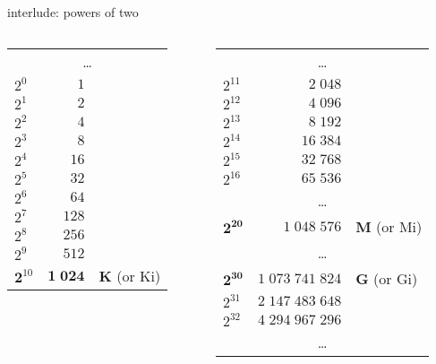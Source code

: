 \begin{frame}[t]{interlude: powers of two}
\begin{columns}[t]
\begin{column}{0.5\textwidth}
\small
\begin{tabular}{lrl}
\multicolumn{3}{c}{\ldots} \\
$2^0$ & $1$ & \\
$2^1$ & $2$ & \\
$2^2$ & $4$ & \\
$2^3$ & $8$ & \\
$2^4$ & $16$ & \\
$2^5$ & $32$ & \\
$2^6$ & $64$ & \\
$2^7$ & $128$ & \\
$2^8$ & $256$ & \\
$2^9$ & $512$ & \\
$\mathbf 2^{10}$ & $\mathbf{1\;024}$ & {\bf K} (or Ki) \\
\end{tabular}
\end{column}
\begin{column}{0.5\textwidth}
\small
\begin{tabular}{lrl}
\multicolumn{3}{c}{\ldots} \\
$2^{11}$ & $2\;048$ & \\
$2^{12}$ & $4\;096$ & \\
$2^{13}$ & $8\;192$ & \\
$2^{14}$ & $16\;384$ & \\
$2^{15}$ & $32\;768$ & \\
$2^{16}$ & $65\;536$ & \\
\multicolumn{3}{c}{\ldots} \\
$\mathbf{2^{20}}$ & $1\;048\;576$ & {\bf M} (or Mi) \\
\multicolumn{3}{c}{\ldots} \\
$\mathbf{2^{30}}$ & $1\;073\;741\;824$ & {\bf G} (or Gi) \\
$2^{31}$ & ${2\;147\;483\;648}$ & \\
$2^{32}$ & ${4\;294\;967\;296}$ & \\
\multicolumn{3}{c}{\ldots} \\
\end{tabular}
\end{column}
\end{columns}
\end{frame}
